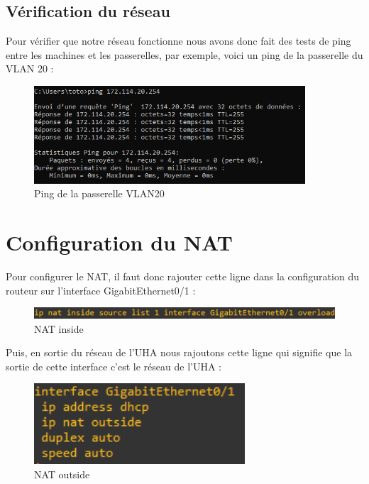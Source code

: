 \documentclass[12pt, a4paper]{article}
\begin{document}
		\subsection{Vérification du réseau}
		Pour vérifier que notre réseau fonctionne nous avons donc fait des tests de ping 
		entre les machines et les passerelles, par exemple, voici un ping de la passerelle
		du VLAN 20 :
		\begin{figure}[H]
			\centering
			\includegraphics[width=0.9\textwidth]{../screens/routeur/pingpasserelle.png}
			\caption{Ping de la passerelle VLAN20}
			\label{fig:pingp}
		\end{figure}

	\section{Configuration du NAT}

	Pour configurer le NAT, il faut donc rajouter cette ligne dans la configuration du routeur
	sur l'interface GigabitEthernet0/1 :
	\begin{figure}[H]
		\centering
		\includegraphics[width=1\textwidth]{../screens/routeur/nat.png}
		\caption{NAT inside}
		\label{fig:nat}
	\end{figure}
	
	Puis, en sortie du réseau de l'UHA nous rajoutons cette ligne qui signifie que la sortie 
	de cette interface c'est le réseau de l'UHA :

	\begin{figure}[H]
		\centering
		\includegraphics[width=0.7\textwidth]{../screens/routeur/IP-nat-outside.png}
		\caption{NAT outside}
		\label{fig:recup}
	\end{figure}
\end{document}

